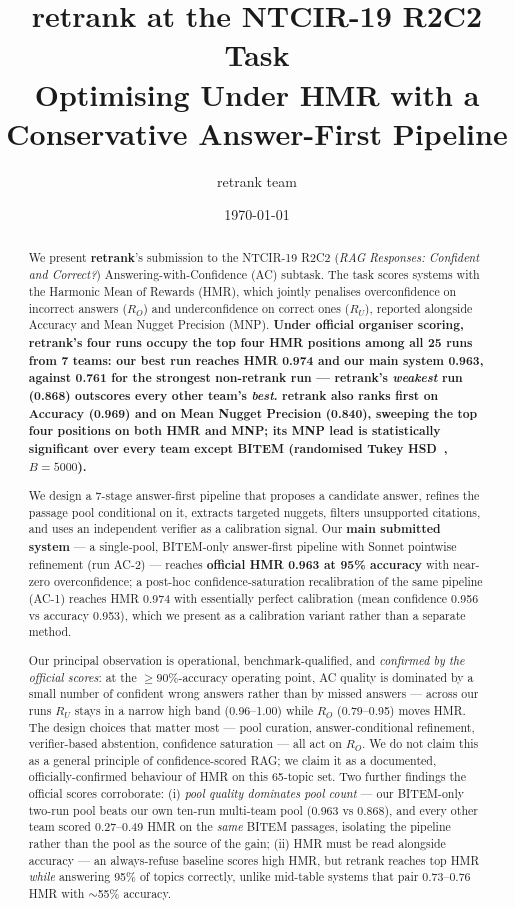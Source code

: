 \documentclass[11pt,a4paper]{article}
\title{retrank at the NTCIR-19 R2C2 Task \\
  \Large Optimising Under HMR with a Conservative Answer-First Pipeline}
\author{retrank team}
\date{\today}
\newcommand{\HMR}{\textsc{HMR}}
\newcommand{\MNP}{\textsc{MNP}}
\begin{document}
\maketitle

\begin{abstract}
We present \textbf{retrank}'s submission to the NTCIR-19 R2C2 (\emph{RAG
Responses: Confident and Correct?}) Answering-with-Confidence (AC) subtask.
The task scores systems with the Harmonic Mean of Rewards (\HMR), which
jointly penalises overconfidence on incorrect answers ($R_O$) and
underconfidence on correct ones ($R_U$), reported alongside Accuracy and
Mean Nugget Precision (\MNP). \textbf{Under official organiser scoring,
retrank's four runs occupy the top four \HMR{} positions among all 25 runs
from 7 teams: our best run reaches \HMR{} 0.974 and our main system 0.963,
against 0.761 for the strongest non-retrank run --- retrank's \emph{weakest}
run (0.868) outscores every other team's \emph{best}. retrank also ranks
first on Accuracy (0.969) and on Mean Nugget Precision (0.840), sweeping the
top four positions on both \HMR{} and \MNP; its \MNP{} lead is statistically
significant over every team except BITEM (randomised Tukey HSD~\cite{sakai-sigtest}, $B{=}5000$).}

We design a 7-stage answer-first pipeline that proposes a candidate answer,
refines the passage pool conditional on it, extracts targeted nuggets,
filters unsupported citations, and uses an independent verifier as a
calibration signal. Our \textbf{main submitted system} --- a single-pool,
BITEM-only answer-first pipeline with Sonnet pointwise refinement (run
AC-2) --- reaches \textbf{official \HMR{} 0.963 at 95\% accuracy} with
near-zero overconfidence; a post-hoc confidence-saturation recalibration of
the same pipeline (AC-1) reaches \HMR{} 0.974 with essentially perfect
calibration (mean confidence 0.956 vs accuracy 0.953), which we present as
a calibration variant rather than a separate method.

Our principal observation is operational, benchmark-qualified, and
\emph{confirmed by the official scores}: at the $\geq 90$\%-accuracy
operating point, AC quality is dominated by a small number of confident
wrong answers rather than by missed answers --- across our runs $R_U$ stays
in a narrow high band (0.96--1.00) while $R_O$ (0.79--0.95) moves \HMR.
The design choices that matter most --- pool curation, answer-conditional
refinement, verifier-based abstention, confidence saturation --- all act on
$R_O$. We do not claim this as a general principle of confidence-scored
RAG; we claim it as a documented, officially-confirmed behaviour of \HMR{}
on this 65-topic set. Two further findings the official scores corroborate:
(i) \emph{pool quality dominates pool count} --- our BITEM-only two-run pool
beats our own ten-run multi-team pool (0.963 vs 0.868), and every other team
scored 0.27--0.49 \HMR{} on the \emph{same} BITEM passages, isolating the
pipeline rather than the pool as the source of the gain; (ii) \HMR{} must be
read alongside accuracy --- an always-refuse baseline scores high \HMR, but
retrank reaches top \HMR{} \emph{while} answering 95\% of topics correctly,
unlike mid-table systems that pair 0.73--0.76 \HMR{} with $\sim$55\% accuracy.


\end{abstract}
\end{document}
